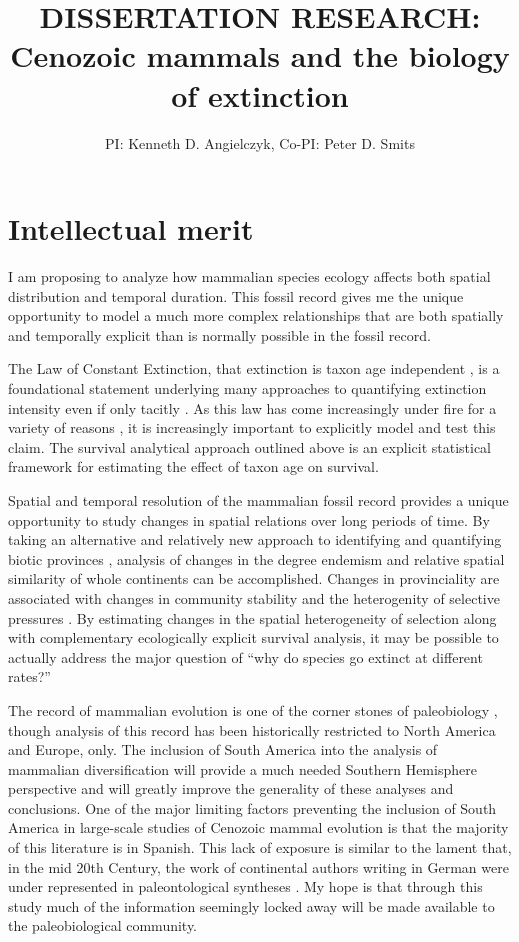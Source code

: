 \documentclass[11pt,letterpaper]{article}
\title{\uppercase{Dissertation Research:}\\ Cenozoic mammals and the biology of extinction}
\author{PI: Kenneth D. Angielczyk, Co-PI: Peter D. Smits}
\date{}
\begin{document}
\linenumbers
\modulolinenumbers[2]

\setcounter{secnumdepth}{0}

\maketitle

\section{Intellectual merit}
I am proposing to analyze how mammalian species ecology affects both spatial distribution and temporal duration. This fossil record gives me the unique opportunity to model a much more complex relationships that are both spatially and temporally explicit than is normally possible in the fossil record. 

The Law of Constant Extinction, that extinction is taxon age independent \citep{VanValen1973}, is a foundational statement underlying many approaches to quantifying extinction intensity even if only tacitly \citep{Alroy2014a,Foote1996e,Foote1997c,Foote2000,Raup1975,Sepkoski1975}. As this law has come increasingly under fire for a variety of reasons \citep{Drake2014,Raup1975,Sepkoski1975,Finnegan2008}, it is increasingly important to explicitly model and test this claim. The survival analytical approach outlined above is an explicit statistical framework for estimating the effect of taxon age on survival.

Spatial and temporal resolution of the mammalian fossil record provides a unique opportunity to study changes in spatial relations over long periods of time. By taking an alternative and relatively new approach to identifying and quantifying biotic provinces \citep{Sidor2013,Vilhena2013b,Vilhena2013}, analysis of changes in the degree endemism and relative spatial similarity of whole continents can be accomplished. Changes in provinciality are associated with changes in community stability and the heterogenity of selective pressures \citep{Sidor2013,Vilhena2013}. By estimating changes in the spatial heterogeneity of selection along with complementary ecologically explicit survival analysis, it may be possible to actually address the major question of ``why do species go extinct at different rates?''

The record of mammalian evolution is one of the corner stones of paleobiology \citep{Simpson1944}, though analysis of this record has been historically restricted to North America and Europe, only. The inclusion of South America into the analysis of mammalian diversification will provide a much needed Southern Hemisphere perspective and will greatly improve the generality of these analyses and conclusions. One of the major limiting factors preventing the inclusion of South America in large-scale studies of Cenozoic mammal evolution is that the majority of this literature is in Spanish. This lack of exposure is similar to the lament that, in the mid 20th Century, the work of continental authors writing in German were under represented in paleontological syntheses \citep{Gould1979a}. My hope is that through this study much of the information seemingly locked away will be made available to the paleobiological community.
\end{document}
